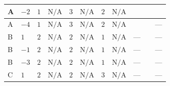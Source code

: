 \documentclass[8pt]{article}
\begin{document}
\begin{landscape}
\begin{longtable}{@{}llcccccc >{\raggedright\arraybackslash}p{0.21\linewidth} >{\raggedright\arraybackslash}p{0.21\linewidth} >{\raggedright\arraybackslash}p{0.21\linewidth}@{}}
\midrule
A & $-2$ & $1$ & $\text{N/A}$ & $3$ & $\text{N/A}$ & $2$ & $\text{N/A}$ & \scriptsize\adjustbox{max width=\linewidth}{$\begin{gathered} +4 {\lambda_{12}^{(1)}} {\lambda_{S_2}^{(A)}}\end{gathered}$} & \scriptsize\adjustbox{max width=\linewidth}{$\begin{gathered} +4 {\lambda_{HS_1}^{(1)}} {\lambda_{HS_2}^{(1)}}\end{gathered}$} & \scriptsize\adjustbox{max width=\linewidth}{$\begin{gathered} +20 {\lambda_{X_{2}}} \left({\lambda_{X_{7}}^{(1)}}\right)^{*}\end{gathered}$} \\
\midrule
A & $-4$ & $1$ & $\text{N/A}$ & $3$ & $\text{N/A}$ & $2$ & $\text{N/A}$ & \scriptsize\adjustbox{max width=\linewidth}{$\begin{gathered} +4 {\lambda_{12}^{(1)}} {\lambda_{S_2}^{(A)}}\end{gathered}$} & \scriptsize\adjustbox{max width=\linewidth}{$\begin{gathered} +4 {\lambda_{HS_1}^{(1)}} {\lambda_{HS_2}^{(1)}}\end{gathered}$} & --- \\
\midrule
B & $1$ & $2$ & $\text{N/A}$ & $2$ & $\text{N/A}$ & $1$ & $\text{N/A}$ & --- & \scriptsize\adjustbox{max width=\linewidth}{$\begin{gathered} +4 {\lambda_{HS_1}^{(1)}} {\lambda_{HS_2}^{(1)}}\end{gathered}$} & --- \\
\midrule
B & $-1$ & $2$ & $\text{N/A}$ & $2$ & $\text{N/A}$ & $1$ & $\text{N/A}$ & --- & \scriptsize\adjustbox{max width=\linewidth}{$\begin{gathered} +4 {\lambda_{HS_1}^{(1)}} {\lambda_{HS_2}^{(1)}}\end{gathered}$} & --- \\
\midrule
B & $-3$ & $2$ & $\text{N/A}$ & $2$ & $\text{N/A}$ & $1$ & $\text{N/A}$ & --- & \scriptsize\adjustbox{max width=\linewidth}{$\begin{gathered} +4 {\lambda_{HS_1}^{(1)}} {\lambda_{HS_2}^{(1)}}\end{gathered}$} & --- \\
\midrule
C & $1$ & $2$ & $\text{N/A}$ & $2$ & $\text{N/A}$ & $3$ & $\text{N/A}$ & --- & \scriptsize\adjustbox{max width=\linewidth}{$\begin{gathered} +4 {\lambda_{HS_1}^{(1)}} {\lambda_{HS_2}^{(1)}}\end{gathered}$} & --- \\

\end{longtable}
\end{landscape}
\end{document}
